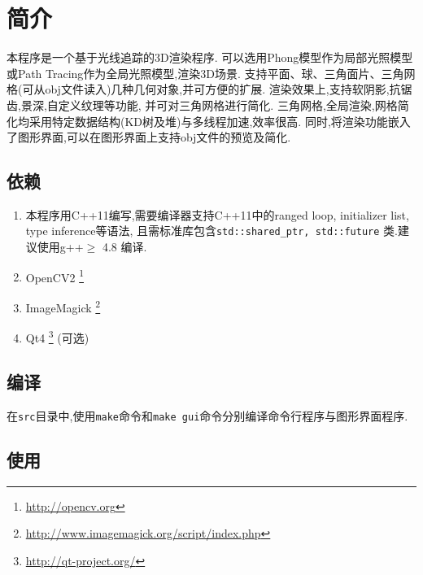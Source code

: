 
\section{简介}
本程序是一个基于光线追踪的3D渲染程序.
可以选用Phong模型\cite{phong}作为局部光照模型或Path Tracing\cite{pathtracing}作为全局光照模型,渲染3D场景.
支持平面、球、三角面片、三角网格(可从obj文件读入)几种几何对象,并可方便的扩展.
渲染效果上,支持软阴影,抗锯齿,景深,自定义纹理等功能, 并可对三角网格进行简化.
三角网格,全局渲染,网格简化均采用特定数据结构(KD树及堆)与多线程加速,效率很高.
同时,将渲染功能嵌入了图形界面,可以在图形界面上支持obj文件的预览及简化.

\subsection{依赖}
\begin{enumerate}
  \item 本程序用C++11编写,需要编译器支持C++11中的ranged loop, initializer list, type inference等语法,
    且需标准库包含\verb|std::shared_ptr, std::future|
    类.建议使用g++$ \ge$ 4.8 编译.

  \item OpenCV2 \footnote{\url{http://opencv.org}}

  \item ImageMagick \footnote{\url{http://www.imagemagick.org/script/index.php}}

\item Qt4  \footnote{\url{http://qt-project.org/}} (可选)
\end{enumerate}

\subsection{编译}
在\verb|src|目录中,使用\verb|make|命令和\verb|make gui|命令分别编译命令行程序与图形界面程序.

\subsection{使用}

